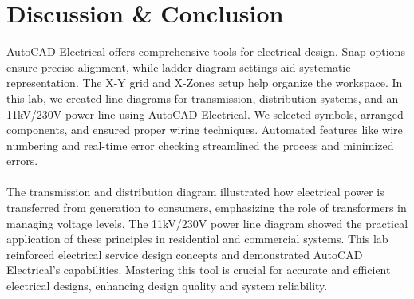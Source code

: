 \documentclass[12pt]{article}
\begin{document}
\section*{Discussion \& Conclusion}
AutoCAD Electrical offers comprehensive tools for electrical design. Snap options ensure precise alignment, while ladder diagram settings aid systematic representation. The X-Y grid and X-Zones setup help organize the workspace. In this lab, we created line diagrams for transmission, distribution systems, and an 11kV/230V power line using AutoCAD Electrical. We selected symbols, arranged components, and ensured proper wiring techniques. Automated features like wire numbering and real-time error checking streamlined the process and minimized errors.
\\\\
The transmission and distribution diagram illustrated how electrical power is transferred from generation to consumers, emphasizing the role of transformers in managing voltage levels. The 11kV/230V power line diagram showed the practical application of these principles in residential and commercial systems. This lab reinforced electrical service design concepts and demonstrated AutoCAD Electrical's capabilities. Mastering this tool is crucial for accurate and efficient electrical designs, enhancing design quality and system reliability.

% 
% 
\end{document}
